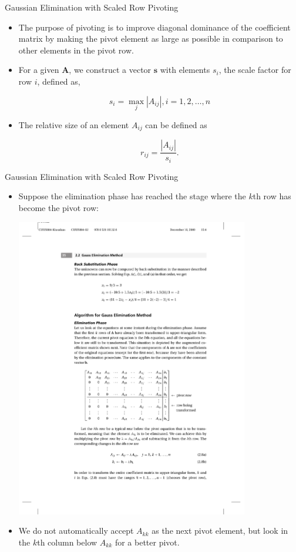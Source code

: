 \documentclass{beamer}
\begin{document}
\begin{frame}{Gaussian Elimination with Scaled Row Pivoting}
\begin{itemize}
\item The purpose of pivoting is to improve \alert{diagonal dominance} of the coefficient matrix by making the \alert{pivot element} as \alert{large} as possible in comparison to other elements in the pivot row.
\item For a given $\mathbf{A}$, we construct a vector $\mathbf{s}$ with elements $s_i$, the \alert{scale factor for row $i$}, defined as, 

\[
s_i=\max_{j}|A_{ij}|, i=1,2,\ldots,n
\]

\item The relative size of an element $A_{ij}$ can be defined as 

\[
r_{ij}=\frac{|A_{ij}|}{s_i}.
\]

\end{itemize}
\end{frame}
\begin{frame}{Gaussian Elimination with Scaled Row Pivoting}
\begin{itemize}
\item Suppose the elimination phase has reached the stage where the $k$th row has become the pivot row:
\centerline{\includegraphics[width=0.8\textwidth]{Lec10_Fig2}}
\item We do not automatically accept $A_{kk}$ as the next pivot element, but look in the $k$th column below $A_{kk}$ for a \alert{better} pivot.
\end{itemize}
\end{frame}
\end{document}
